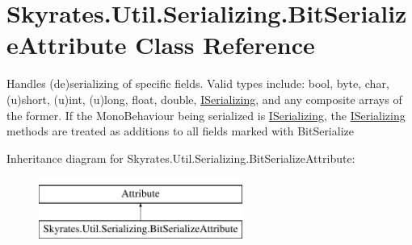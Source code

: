 \hypertarget{class_skyrates_1_1_util_1_1_serializing_1_1_bit_serialize_attribute}{\section{Skyrates.\-Util.\-Serializing.\-Bit\-Serialize\-Attribute Class Reference}
\label{class_skyrates_1_1_util_1_1_serializing_1_1_bit_serialize_attribute}
}


Handles (de)serializing of specific fields. Valid types include\-: bool, byte, char, (u)short, (u)int, (u)long, float, double, \hyperlink{interface_skyrates_1_1_util_1_1_serializing_1_1_i_serializing}{I\-Serializing}, and any composite arrays of the former. If the Mono\-Behaviour being serialized is \hyperlink{interface_skyrates_1_1_util_1_1_serializing_1_1_i_serializing}{I\-Serializing}, the \hyperlink{interface_skyrates_1_1_util_1_1_serializing_1_1_i_serializing}{I\-Serializing} methods are treated as additions to all fields marked with Bit\-Serialize  


Inheritance diagram for Skyrates.\-Util.\-Serializing.\-Bit\-Serialize\-Attribute\-:\begin{figure}[H]
\begin{center}
\leavevmode
\includegraphics[height=2.000000cm]{class_skyrates_1_1_util_1_1_serializing_1_1_bit_serialize_attribute}
\end{center}
\end{figure}
